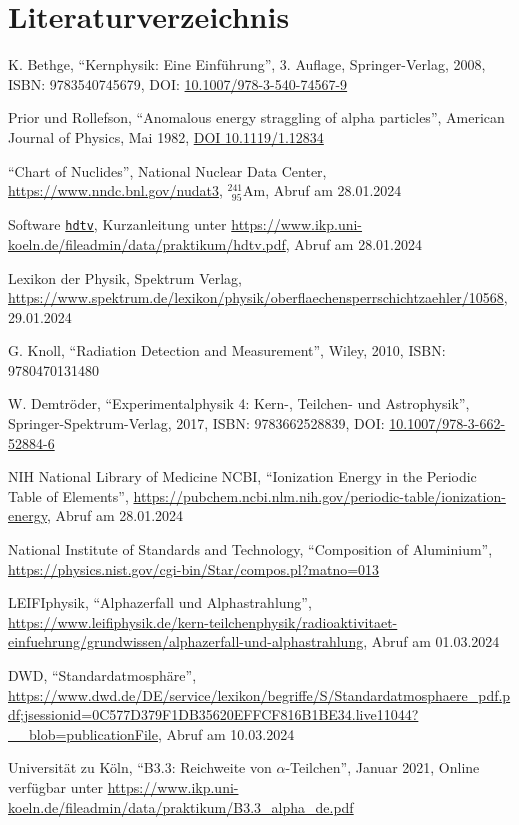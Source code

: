 \documentclass[12pt,a4paper]{scrartcl}
\numberwithin{equation}{section} %
\begin{document}
\clearpage
\hypertarget{literatur}{%
\section{Literaturverzeichnis}\label{literatur}}
\renewcommand{\section}[2]{}

\begin{thebibliography}{99}
	K. Bethge, ``Kernphysik: Eine Einführung'', 3. Auflage,
	Springer-Verlag, 2008, ISBN: 9783540745679, DOI:
	\href{https://doi.org/10.1007/978-3-540-74567-9}{10.1007/978-3-540-74567-9}

	Prior und Rollefson, ``Anomalous energy straggling of alpha
	particles'', American Journal of Physics, Mai 1982,
	\href{https://doi.org/10.1119/1.12834}{DOI 10.1119/1.12834}

	``Chart of Nuclides'', National Nuclear Data Center,
	\url{https://www.nndc.bnl.gov/nudat3}, $^{241}_{\ \ 95}\mathrm{Am}$,
	Abruf am 28.01.2024

	Software \href{https://pypi.org/project/hdtv}{\texttt{hdtv}},
	Kurzanleitung unter
	\url{https://www.ikp.uni-koeln.de/fileadmin/data/praktikum/hdtv.pdf},
	Abruf am 28.01.2024

	Lexikon der Physik, Spektrum Verlag,
	\url{https://www.spektrum.de/lexikon/physik/oberflaechensperrschichtzaehler/10568},
	29.01.2024

	G. Knoll, ``Radiation Detection and Measurement'', Wiley, 2010, ISBN:
	9780470131480

	W. Demtröder, ``Experimentalphysik 4: Kern-, Teilchen- und
	Astrophysik'', Springer-Spektrum-Verlag, 2017, ISBN: 9783662528839,
	DOI:
	\href{https://doi.org/10.1007/978-3-662-52884-6}{10.1007/978-3-662-52884-6}

	NIH National Library of Medicine NCBI, ``Ionization Energy in the
	Periodic Table of Elements'',
	\url{https://pubchem.ncbi.nlm.nih.gov/periodic-table/ionization-energy},
	Abruf am 28.01.2024
	
	National Institute of Standards and Technology, ``Composition of  Aluminium'',
	\url{https://physics.nist.gov/cgi-bin/Star/compos.pl?matno=013}

	LEIFIphysik, ``Alphazerfall und Alphastrahlung'',
	\url{https://www.leifiphysik.de/kern-teilchenphysik/radioaktivitaet-einfuehrung/grundwissen/alphazerfall-und-alphastrahlung},
	Abruf am 01.03.2024

	DWD, ``Standardatmosphäre'',
	\url{https://www.dwd.de/DE/service/lexikon/begriffe/S/Standardatmosphaere_pdf.pdf;jsessionid=0C577D379F1DB35620EFFCF816B1BE34.live11044?__blob=publicationFile}, Abruf am 10.03.2024

	Universität zu Köln, ``B3.3: Reichweite von $\alpha$-Teilchen'', Januar 2021, Online verfügbar unter \url{https://www.ikp.uni-koeln.de/fileadmin/data/praktikum/B3.3_alpha_de.pdf}

\end{thebibliography}
\end{document}
